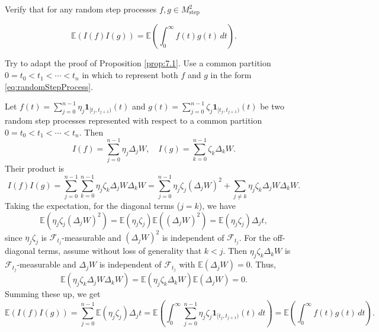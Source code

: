 \begin{Exercise}
\label{ex:7.2}
Verify that for any random step processes $f, g \in M_{\mathrm{step}}^2$

\begin{equation}
\mathbb{E}(I(f) I(g)) = \mathbb{E}\left(\int_0^\infty f(t) g(t) \, dt\right).
\end{equation}

\begin{hint}
Try to adapt the proof of Proposition \ref{prop:7.1}. Use a common partition $0 = t_0 < t_1 < \cdots < t_n$ in which to represent both $f$ and $g$ in the form \eqref{eq:randomStepProcess}.
\end{hint}
\end{Exercise}

\begin{Solution}
Let $f(t) = \sum_{j=0}^{n-1} \eta_j \mathbf{1}_{[t_j, t_{j+1})}(t)$ and $g(t) = \sum_{j=0}^{n-1} \zeta_j \mathbf{1}_{[t_j, t_{j+1})}(t)$ be two random step processes represented with respect to a common partition $0 = t_0 < t_1 < \cdots < t_n$. Then
\begin{equation*}
I(f) = \sum_{j=0}^{n-1} \eta_j \Delta_j W, \quad I(g) = \sum_{k=0}^{n-1} \zeta_k \Delta_k W.
\end{equation*}
Their product is
\begin{equation*}
I(f)I(g) = \sum_{j=0}^{n-1} \sum_{k=0}^{n-1} \eta_j \zeta_k \Delta_j W \Delta_k W = \sum_{j=0}^{n-1} \eta_j \zeta_j (\Delta_j W)^2 + \sum_{j \neq k} \eta_j \zeta_k \Delta_j W \Delta_k W.
\end{equation*}
Taking the expectation, for the diagonal terms ($j=k$), we have
\begin{equation*}
\mathbb{E}(\eta_j \zeta_j (\Delta_j W)^2) = \mathbb{E}(\eta_j \zeta_j) \mathbb{E}((\Delta_j W)^2) = \mathbb{E}(\eta_j \zeta_j) \Delta_j t,
\end{equation*}
since $\eta_j \zeta_j$ is $\mathcal{F}_{t_j}$-measurable and $(\Delta_j W)^2$ is independent of $\mathcal{F}_{t_j}$.
For the off-diagonal terms, assume without loss of generality that $k < j$. Then $\eta_j \zeta_k \Delta_k W$ is $\mathcal{F}_{t_j}$-measurable and $\Delta_j W$ is independent of $\mathcal{F}_{t_j}$ with $\mathbb{E}(\Delta_j W) = 0$. Thus,
\begin{equation*}
\mathbb{E}(\eta_j \zeta_k \Delta_j W \Delta_k W) = \mathbb{E}(\eta_j \zeta_k \Delta_k W) \mathbb{E}(\Delta_j W) = 0.
\end{equation*}
Summing these up, we get
\begin{equation*}
\mathbb{E}(I(f)I(g)) = \sum_{j=0}^{n-1} \mathbb{E}(\eta_j \zeta_j) \Delta_j t = \mathbb{E}\left( \int_0^\infty \sum_{j=0}^{n-1} \eta_j \zeta_j \mathbf{1}_{[t_j, t_{j+1})}(t) \, dt \right) = \mathbb{E}\left( \int_0^\infty f(t)g(t) \, dt \right).
\end{equation*}
\end{Solution}

